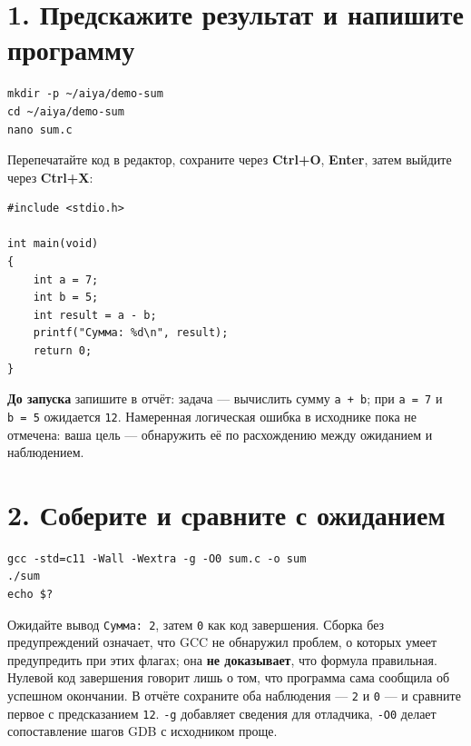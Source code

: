\hypertarget{1-ux43fux440ux435ux434ux441ux43aux430ux436ux438ux442ux435-ux440ux435ux437ux443ux43bux44cux442ux430ux442-ux438-ux43dux430ux43fux438ux448ux438ux442ux435-ux43fux440ux43eux433ux440ux430ux43cux43cux443}{%
\section{1. Предскажите результат и напишите
программу}\label{1-ux43fux440ux435ux434ux441ux43aux430ux436ux438ux442ux435-ux440ux435ux437ux443ux43bux44cux442ux430ux442-ux438-ux43dux430ux43fux438ux448ux438ux442ux435-ux43fux440ux43eux433ux440ux430ux43cux43cux443}}

\begin{verbatim}
mkdir -p ~/aiya/demo-sum
cd ~/aiya/demo-sum
nano sum.c
\end{verbatim}

Перепечатайте код в редактор, сохраните через \textbf{Ctrl+O},
\textbf{Enter}, затем выйдите через \textbf{Ctrl+X}:

\begin{verbatim}
#include <stdio.h>

int main(void)
{
    int a = 7;
    int b = 5;
    int result = a - b;
    printf("Сумма: %d\n", result);
    return 0;
}
\end{verbatim}

\textbf{До запуска} запишите в отчёт: задача --- вычислить сумму
\texttt{a\ +\ b}; при \texttt{a\ =\ 7} и \texttt{b\ =\ 5} ожидается
\texttt{12}. Намеренная логическая ошибка в исходнике пока не отмечена:
ваша цель --- обнаружить её по расхождению между ожиданием и
наблюдением.

\hypertarget{2-ux441ux43eux431ux435ux440ux438ux442ux435-ux438-ux441ux440ux430ux432ux43dux438ux442ux435-ux441-ux43eux436ux438ux434ux430ux43dux438ux435ux43c}{%
\section{2. Соберите и сравните с
ожиданием}\label{2-ux441ux43eux431ux435ux440ux438ux442ux435-ux438-ux441ux440ux430ux432ux43dux438ux442ux435-ux441-ux43eux436ux438ux434ux430ux43dux438ux435ux43c}}

\begin{verbatim}
gcc -std=c11 -Wall -Wextra -g -O0 sum.c -o sum
./sum
echo $?
\end{verbatim}

Ожидайте вывод \texttt{Сумма:\ 2}, затем \texttt{0} как код завершения.
Сборка без предупреждений означает, что GCC не обнаружил проблем, о
которых умеет предупредить при этих флагах; она \textbf{не доказывает},
что формула правильная. Нулевой код завершения говорит лишь о том, что
программа сама сообщила об успешном окончании. В отчёте сохраните оба
наблюдения --- \texttt{2} и \texttt{0} --- и сравните первое с
предсказанием \texttt{12}. \texttt{-g} добавляет сведения для отладчика,
\texttt{-O0} делает сопоставление шагов GDB с исходником проще.

